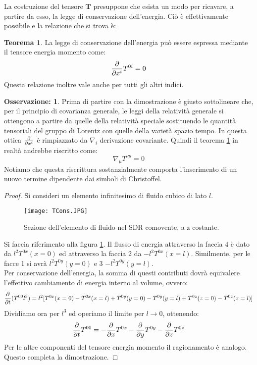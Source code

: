 \documentclass[]{report}
\theoremstyle{definition}
\theoremstyle{Theorem}
\newtheorem{Theo}[Def]{Teorema}
\theoremstyle{definition}
\theoremstyle{definition}
\theoremstyle{definition}
\newtheorem{Obs}[Def]{Osservazione:}
\begin{document}
La costruzione del tensore $\textbf{T}$ presuppone che esista un modo per ricavare, a partire da esso, la legge di conservazione dell'energia. Ciò è effettivamente possibile e la relazione che si trova è:
\begin{Theo} \label{Teo 2} La legge di conservazione dell'energia può essere espressa mediante il tensore energia momento come:
	$${\partial \over \partial x^i}T^{0i}=0$$
	Questa relazione inoltre vale anche per tutti gli altri indici.	
\end{Theo}
\begin{Obs}
Prima di partire con la dimostrazione è giusto sottolineare che, per il principio di covarianza generale, le leggi della relatività generale si ottengono a partire da quelle della relatività speciale sostituendo le quantità tensoriali del gruppo di Lorentz con quelle della varietà spazio tempo. In questa ottica ${\partial \over \partial x^i}$ è rimpiazzato da $\nabla_i$ derivazione covariante. Quindi il teorema \ref{Teo 2} in realtà andrebbe riscritto come:
$$\nabla_\mu T^{\nu\mu}=0$$
Notiamo che questa riscrittura sostanzialmente comporta l'inserimento di un nuovo termine dipendente dai simboli di Christoffel.
\end{Obs}
\begin{proof}
	Si consideri un elemento infinitesimo di fluido cubico di lato $l$.
	\begin{figure} [H]
		\centering
		\label{Image 2}
		\texttt{[image: TCons.JPG]}
		\caption{Sezione dell'elemento di fluido nel SDR comovente, a z costante.}	
	\end{figure}
Si faccia riferimento alla figura \ref{Image 2}. Il flusso di energia attraverso la faccia 4 è dato da $l^2T^{0x}(x=0)$ ed attraverso la faccia 2 da $-l^2T^{0x}(x=l)$. Similmente, per le facce 1 si avrà $l^2T^{0y}(y=0)$ e 3 $-l^2T^{0y}(y=l)$.\\
Per conservazione dell'energia, la somma di questi contributi dovrà equivalere l'effettivo cambiamento di energia interno al volume, ovvero:
$${\partial \over \partial t}(T^{00}l^3)=l^2[T^{0x}(x=0)-T^{0x}(x=l)+T^{0y}(y=0)-T^{0y}(y=l)+T^{0z}(z=0)-T^{0z}(z=l)]$$
Dividiamo ora per $l^3$ ed operiamo il limite per $l\rightarrow 0$, ottenendo:
$${\partial \over \partial t}T^{00}=-{\partial \over \partial x}T^{0x}-{\partial \over \partial y}T^{0y}-{\partial \over \partial z}T^{0z}$$
Per le altre componenti del tensore energia momento il ragionamento è analogo.
Questo completa la dimostrazione.
\end{proof}
\end{document}

